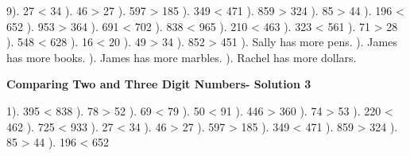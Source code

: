\documentclass{article}%
\begin{document}
9). 27 < 34%
). 46 > 27%
). 597 > 185%
). 349 < 471%
). 859 > 324%
). 85 > 44%
). 196 < 652%
). 953 > 364%
). 691 < 702%
). 838 < 965%
). 210 < 463%
). 323 < 561%
). 71 > 28%
). 548 < 628%
). 16 < 20%
). 49 > 34%
). 852 > 451%
). Sally has more pens.%
). James has more books.%
). James has more marbles.%
). Rachel has more dollars.%
\newline%
\newpage%
\large%
\begin{center}%
\textbf{Comparing Two and Three Digit Numbers- Solution 3}%
\newline%
\end{center} \normalsize%
1). 395 < 838%
). 78 > 52%
). 69 < 79%
). 50 < 91%
). 446 > 360%
). 74 > 53%
). 220 < 462%
). 725 < 933%
). 27 < 34%
). 46 > 27%
). 597 > 185%
). 349 < 471%
). 859 > 324%
). 85 > 44%
). 196 < 652%
\newline%
\end{document}
